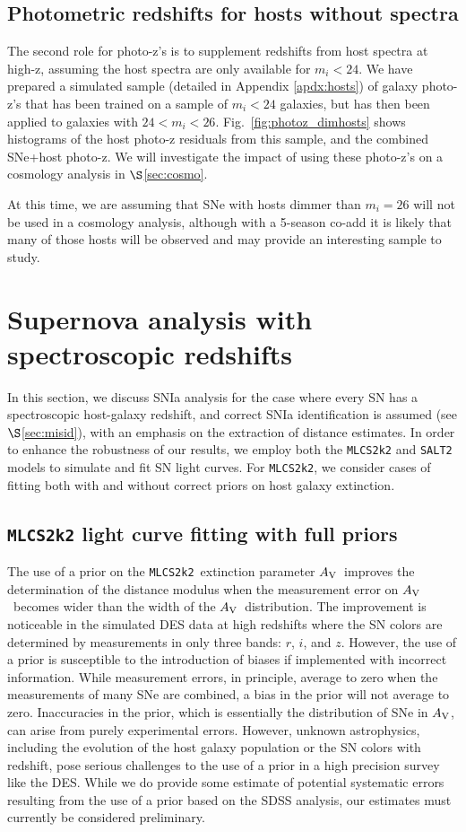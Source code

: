 \documentclass[preprint2]{aastex}    %
\newcommand\av{$A_{\rm V}$}
\newcommand{\mlcs}{{\tt MLCS2k2}}
\newcommand{\salt}{{\tt SALT2}}
\begin{document}
\subsection{Photometric redshifts for hosts without spectra}\label{sec:dimhosts}
The second role for photo-z's is to supplement 
redshifts from host spectra at high-z, assuming the host
spectra are only available for $m_i<24$.  
We have prepared a simulated sample (detailed in  Appendix \ref{apdx:hosts}) 
of galaxy photo-z's that has been 
trained on a sample of $m_i<24$ galaxies, but has then been 
applied to galaxies with $24<m_i<26$. Fig.~\ref{fig:photoz_dimhosts} 
shows histograms of the host photo-z residuals from this sample, and the combined SNe+host
photo-z.  We will investigate the impact of using these photo-z's 
on a cosmology analysis in $\S$\ref{sec:cosmo}. 

At this time,  we are assuming that SNe with hosts dimmer than $m_i=26$ 
will not be used in a cosmology analysis,  although with a 
5-season co-add it is likely that many of those hosts will
be observed and may provide an interesting sample to study.

\section{Supernova analysis with spectroscopic redshifts}\label{sec:specz_anal}
In this section, we discuss SNIa analysis for the case where every SN has a 
spectroscopic host-galaxy redshift, and correct SNIa identification is assumed
(see $\S$\ref{sec:misid}), 
with an emphasis on the extraction of distance estimates. In order to 
enhance the robustness of our results, we employ both the {\mlcs} and {\salt} models 
to simulate and fit SN light curves. 
For {\mlcs}, we consider cases of fitting both with and without correct priors 
on host galaxy extinction.

\subsection{{\mlcs} light curve fitting with full priors}\label{sec:lcfit_p}
The use of a prior on the \mlcs\ extinction parameter \av\ improves the 
determination of the distance modulus when the measurement error on \av\ 
becomes wider than the width of the \av\ distribution. The improvement is noticeable 
in the simulated DES data at high redshifts where the SN colors are determined 
by measurements in only three bands: $r$, $i$, and $z$.  However, 
the use of a prior is susceptible to the introduction of biases if implemented with
incorrect information. While measurement errors, in principle, 
average to zero when the measurements of many SNe are combined, a bias in the 
prior will not average to zero.  Inaccuracies in the prior, which is essentially 
the distribution of SNe in \av,  can arise from purely experimental 
errors. However, unknown astrophysics, including the evolution of the host galaxy 
population or the SN colors with redshift, pose serious challenges to the use 
of a prior in a high precision survey like the DES.  While we do provide some estimate 
of potential systematic errors resulting from the use of a prior based on the SDSS 
analysis, our estimates must currently be considered preliminary.
\end{document}
